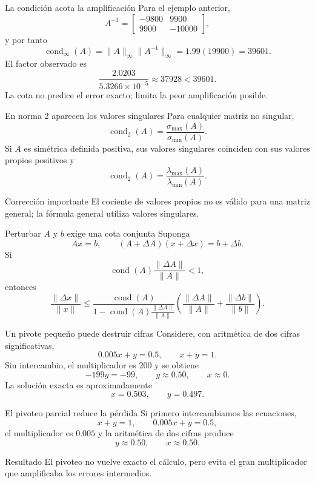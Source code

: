 \documentclass[aspectratio=169,12pt]{beamer}
\newcommand{\mat}[1]{\begin{bmatrix}#1\end{bmatrix}}
\DeclareMathOperator{\cond}{cond}
\begin{document}
\begin{frame}{La condición acota la amplificación}
Para el ejemplo anterior,
\[
A^{-1}=\mat{-9800&9900\\9900&-10000},
\]
y por tanto
\[
\cond_\infty(A)=\|A\|_\infty\|A^{-1}\|_\infty
=1.99(19900)=39601.
\]
El factor observado es
\[
\frac{2.0203}{5.3266\times10^{-5}}\approx37928<39601.
\]
La cota no predice el error exacto; limita la peor amplificación posible.
\end{frame}

\begin{frame}{En norma 2 aparecen los valores singulares}
Para cualquier matriz no singular,
\[
\cond_2(A)=\frac{\sigma_{\max}(A)}{\sigma_{\min}(A)}.
\]
Si $A$ es simétrica definida positiva, sus valores singulares coinciden con
sus valores propios positivos y
\[
\cond_2(A)=\frac{\lambda_{\max}(A)}{\lambda_{\min}(A)}.
\]
\begin{block}{Corrección importante}
El cociente de valores propios no es válido para una matriz general; la fórmula
general utiliza valores singulares.
\end{block}
\end{frame}

\begin{frame}{Perturbar $A$ y $b$ exige una cota conjunta}
Suponga
\[
Ax=b,
\qquad
(A+\Delta A)(x+\Delta x)=b+\Delta b.
\]
Si
\[
\cond(A)\frac{\|\Delta A\|}{\|A\|}<1,
\]
entonces
\[
\frac{\|\Delta x\|}{\|x\|}
\leq
\frac{\cond(A)}{1-\cond(A)\frac{\|\Delta A\|}{\|A\|}}
\left(
\frac{\|\Delta A\|}{\|A\|}+
\frac{\|\Delta b\|}{\|b\|}
\right).
\]
\end{frame}

\begin{frame}{Un pivote pequeño puede destruir cifras}
Considere, con aritmética de dos cifras significativas,
\[
0.005x+y=0.5,
\qquad
x+y=1.
\]
Sin intercambio, el multiplicador es $200$ y se obtiene
\[
-199y=-99,
\qquad y\approx0.50,
\qquad x\approx0.
\]
La solución exacta es aproximadamente
\[
x=0.503,\qquad y=0.497.
\]
\end{frame}

\begin{frame}{El pivoteo parcial reduce la pérdida}
Si primero intercambiamos las ecuaciones,
\[
x+y=1,
\qquad
0.005x+y=0.5,
\]
el multiplicador es $0.005$ y la aritmética de dos cifras produce
\[
y\approx0.50,
\qquad x\approx0.50.
\]
\begin{block}{Resultado}
El pivoteo no vuelve exacto el cálculo, pero evita el gran multiplicador que
amplificaba los errores intermedios.
\end{block}
\end{frame}
\end{document}
